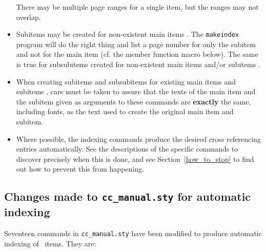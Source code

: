 \documentclass[11pt]{article}
\makeatletter
\newcommand{\TTindex}[1]{\index{#1@{\tt #1}}}
\makeatother
\begin{document}
\begin{itemize}
         There may be multiple page ranges for a single item, but the
         ranges may not overlap.
   \item Subitems may be created for non-existent main items%
         .
         The {\tt makeindex} program will do the right thing and list a 
         page number for only the subitem and not for the main item 
         (cf. the member function macro below).  The same is true for 
         subsubitems created for non-existent main items and/or subitems%
         .
   \item When creating subitems and subsubitems for existing main items
         and subitems%
         , care 
         must be taken to assure that the texts of the main item and the 
         subitem given as arguments to these commands are {\bf exactly}
         the same, including fonts, as the text used to create 
         the original main item and subitem.  
   \item Where possible, the indexing commands produce the desired cross 
         referencing entries automatically.  See 
         the descriptions of the 
         specific commands to discover precisely when this is done, and
         see Section~\ref{how_to_stop} to find out how to prevent this
         from happening.
\end{itemize}

\subsection{Changes made to {\tt cc\_manual.sty} for automatic indexing}%
\label{auto_index}

Seventeen commands in \verb|cc_manual.sty|\TTindex{cc\_manual.sty} have been 
modified to produce automatic indexing of \CC\ items.  They are:
\end{document}
